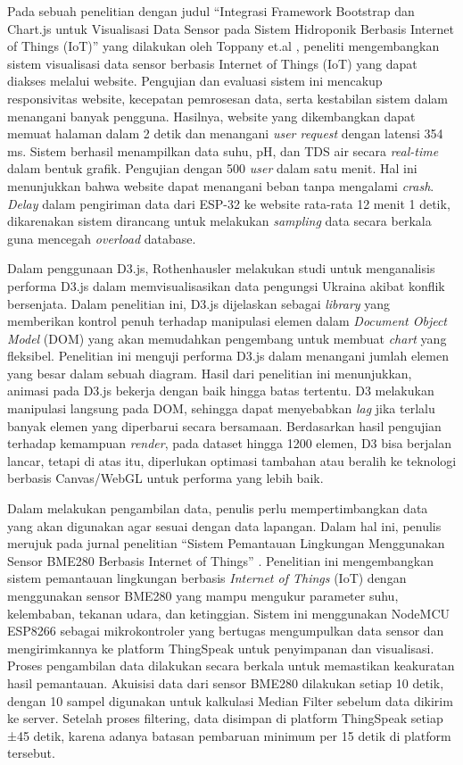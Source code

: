 Pada sebuah penelitian dengan judul “Integrasi Framework Bootstrap dan Chart.js untuk Visualisasi Data Sensor pada Sistem Hidroponik Berbasis Internet of Things (IoT)” yang dilakukan oleh Toppany et.al \cite{Toppany2023}, peneliti mengembangkan sistem visualisasi data sensor berbasis Internet of Things (IoT) yang dapat diakses melalui website. Pengujian dan evaluasi sistem ini mencakup responsivitas website, kecepatan pemrosesan data, serta kestabilan sistem dalam menangani banyak pengguna. Hasilnya, website yang dikembangkan dapat memuat halaman dalam 2 detik dan menangani \textit{user request} dengan latensi 354 ms. Sistem berhasil menampilkan data suhu, pH, dan TDS air secara \textit{real-time} dalam bentuk grafik. Pengujian dengan 500 \textit{user} dalam satu menit. Hal ini menunjukkan bahwa website dapat menangani beban tanpa mengalami \textit{crash}. \textit{Delay} dalam pengiriman data dari ESP-32 ke website rata-rata 12 menit 1 detik, dikarenakan sistem dirancang untuk melakukan \textit{sampling} data secara berkala guna mencegah \textit{overload} database. 

Dalam penggunaan D3.js, Rothenhausler \cite{Rothenhausler2022} melakukan studi untuk menganalisis performa D3.js dalam memvisualisasikan data pengungsi Ukraina akibat konflik bersenjata. Dalam penelitian ini, D3.js dijelaskan sebagai \textit{library} yang memberikan kontrol penuh terhadap manipulasi elemen dalam \textit{Document Object Model} (DOM) yang akan memudahkan pengembang untuk membuat \textit{chart} yang fleksibel. Penelitian ini menguji performa D3.js dalam menangani jumlah elemen yang besar dalam sebuah diagram. Hasil dari penelitian ini menunjukkan, animasi pada D3.js bekerja dengan baik hingga batas tertentu. D3 melakukan manipulasi langsung pada DOM, sehingga dapat menyebabkan \textit{lag} jika terlalu banyak elemen yang diperbarui secara bersamaan. Berdasarkan hasil pengujian terhadap kemampuan \textit{render}, pada dataset hingga 1200 elemen, D3 bisa berjalan lancar, tetapi di atas itu, diperlukan optimasi tambahan atau beralih ke teknologi berbasis Canvas/WebGL untuk performa yang lebih baik. 

Dalam melakukan pengambilan data, penulis perlu mempertimbangkan data yang akan digunakan agar sesuai dengan data lapangan. Dalam hal ini, penulis merujuk pada jurnal penelitian “Sistem Pemantauan Lingkungan Menggunakan Sensor BME280 Berbasis Internet of Things” \cite{Triawan2023}. Penelitian ini mengembangkan sistem pemantauan lingkungan berbasis \textit{Internet of Things} (IoT) dengan menggunakan sensor BME280 yang mampu mengukur parameter suhu, kelembaban, tekanan udara, dan ketinggian. Sistem ini menggunakan NodeMCU ESP8266 sebagai mikrokontroler yang bertugas mengumpulkan data sensor dan mengirimkannya ke platform ThingSpeak untuk penyimpanan dan visualisasi. Proses pengambilan data dilakukan secara berkala untuk memastikan keakuratan hasil pemantauan. Akuisisi data dari sensor BME280 dilakukan setiap 10 detik, dengan 10 sampel digunakan untuk kalkulasi Median Filter sebelum data dikirim ke server. Setelah proses filtering, data disimpan di platform ThingSpeak setiap ±45 detik, karena adanya batasan pembaruan minimum per 15 detik di platform tersebut. 


